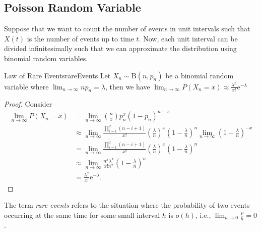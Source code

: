 \documentclass[math]{amznotes}
\theoremstyle{remark}
\newcommand{\0}{\mathbf{0}}
\newcommand{\1}{\mathbf{1}}
\newcommand{\e}{\mathrm{e}}
\begin{document}
\subsection{Poisson Random Variable}
Suppose that we want to count the number of events in unit intervals such that $X\left(t\right)$ is the number of events up to time $t$. Now, each unit interval can be divided infinitesimally such that we can approximate the distribution using binomial random variables.
\begin{thmbox}{Law of Rare Events}{rareEvents}
    Let $X_n \sim \mathrm{B}\left(n, p_n\right)$ be a binomial random variable where $\lim_{n \to \infty}np_n = \lambda$, then we have $\lim_{n \to \infty}P\left(X_n = x\right) \approx \frac{\lambda^x}{x!}\e^{-\lambda}$
    \tcblower
    \begin{proof}
        Consider 
        \begin{align*}
            \lim_{n \to \infty}P\left(X_n = x\right) & = \lim_{n \to \infty}\binom{n}{x}p_n^x\left(1 - p_n\right)^{n - x} \\
            & \approx \lim_{n \to \infty}\frac{\prod_{i = 1}^{x}\left(n - i + 1\right)}{x!}\left(\frac{\lambda}{n}\right)^x\left(1 - \frac{\lambda}{n}\right)^n\lim_{n \to \infty}\left(1 - \frac{\lambda}{n}\right)^{-x} \\
            & = \lim_{n \to \infty}\frac{\prod_{i = 1}^{x}\left(n - i + 1\right)}{x!}\left(\frac{\lambda}{n}\right)^x\left(1 - \frac{\lambda}{n}\right)^n \\
            & \approx \lim_{n \to \infty}\frac{n^x\lambda^x}{x!n^x}\left(1 - \frac{\lambda}{n}\right)^n \\
            & = \frac{\lambda^x}{x!}\e^{-\lambda}.
        \end{align*}
    \end{proof}
\end{thmbox}
The term \textit{rare events} refers to the situation where the probability of two events occurring at the same time for some small interval $h$ is $o\left(h\right)$, i.e., $\lim_{h \to 0}\frac{p}{h} = 0$.
\end{document}
